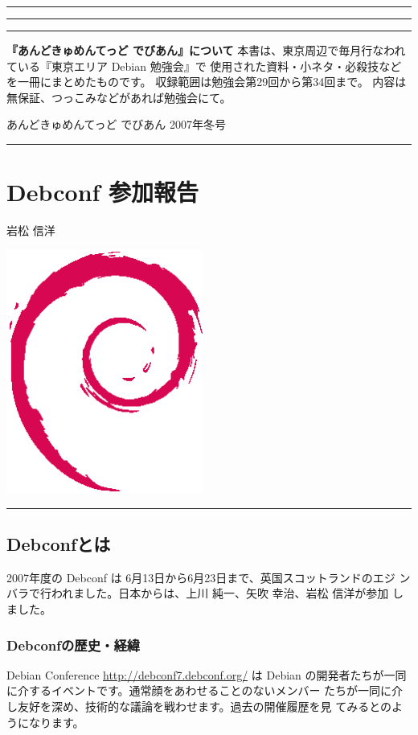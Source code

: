 \documentclass[mingoth,a4paper]{jsarticle}
\renewcommand{\dancersection}[2]{%
\newpage
あんどきゅめんてっど でびあん 2007年冬号
%
\vspace{0.1mm}\\
{\color{dancerlightblue}\rule{\hsize}{2mm}}

%
%
\begin{minipage}[t]{0.7\hsize}
\color{dancerdarkblue}
\vspace{1cm}
\section{#1}
\hfill{}#2\\
\end{minipage}
\begin{minipage}[t]{0.3\hsize}
\vspace{-2cm}
\hfill{}\includegraphics[height=8cm]{image200502/openlogo-nd.eps}\\
\vspace{-5cm}
\end{minipage}
%
%
{\color{dancerdarkblue}\rule{0.74\hsize}{2mm}}
%
\vspace{2cm}
}
\begin{document}
\newpage
\begin{minipage}[]{0.2\hsize}
 \colorbox{dancerlightblue}{}
\end{minipage}
\begin{minipage}[]{0.8\hsize}
\hrule
\vspace{1mm}
\hrule
\setcounter{tocdepth}{1}
{\small
 \tableofcontents}
\vspace{1mm}
\hrule
\vspace{3cm}

{
\large
\begin{itembox}{\bf 『あんどきゅめんてっど でびあん』について}
本書は、東京周辺で毎月行なわれている『東京エリア Debian 勉強会』で
使用された資料・小ネタ・必殺技などを一冊にまとめたものです。
収録範囲は勉強会第29回から第34回まで。
内容は無保証、つっこみなどがあれば勉強会にて。
\end{itembox}
}
\end{minipage}


\dancersection{Debconf 参加報告}{岩松 信洋}
\label{sec:debconfreportsummary}

\subsection{Debconfとは}

  2007年度の Debconf は 6月13日から6月23日まで、英国スコットランドのエジ
ンバラで行われました。日本からは、上川 純一、矢吹 幸治、岩松 信洋が参加
しました。

\subsubsection{Debconfの歴史・経緯}

Debian Conference \url{http://debconf7.debconf.org/} は Debian 
の開発者たちが一同に介するイベントです。通常顔をあわせることのないメンバー
たちが一同に介し友好を深め、技術的な議論を戦わせます。過去の開催履歴を見
てみるとのようになります。
\end{document}
